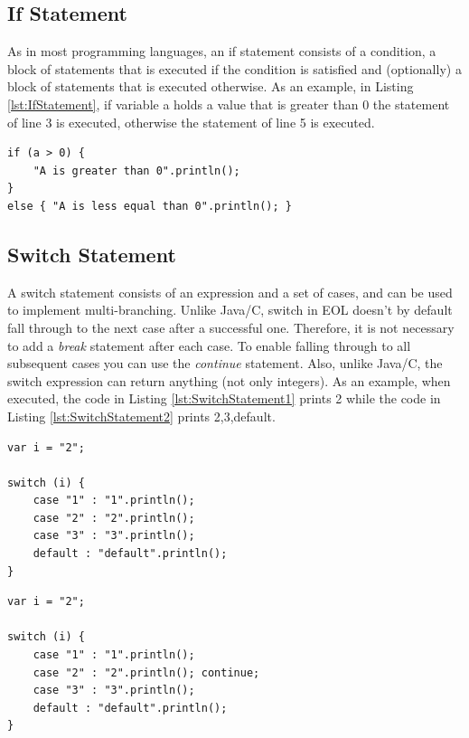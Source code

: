 \subsection{If Statement}

As in most programming languages, an if statement consists of a condition, a block of statements that is executed if the condition is satisfied and (optionally) a block of statements that is executed otherwise. As an example, in Listing \ref{lst:IfStatement}, if variable a holds a value that is greater than 0 the statement of line 3 is executed, otherwise the statement of line 5 is executed.

\begin{lstlisting}[float=h, caption=Example illustrating an if statement, label=lst:IfStatement, language=EOL]
if (a > 0) {
	"A is greater than 0".println();
}
else { "A is less equal than 0".println(); }
\end{lstlisting}

\subsection{Switch Statement}

A switch statement consists of an expression and a set of cases, and can be used to implement multi-branching. Unlike Java/C, switch in EOL doesn't by default fall through to the next case after a successful one. Therefore, it is not necessary to add a \emph{break} statement after each case. To enable falling through to all subsequent cases you can use the \emph{continue} statement. Also, unlike Java/C, the switch expression can return anything (not only integers). As an example, when executed, the code in Listing \ref{lst:SwitchStatement1} prints 2 while the code in Listing \ref{lst:SwitchStatement2} prints 2,3,default.

\begin{lstlisting}[float=h, caption=Example illustrating a switch statement, label=lst:SwitchStatement1, language=EOL]
var i = "2";

switch (i) {
	case "1" : "1".println(); 
	case "2" : "2".println();
	case "3" : "3".println();
	default : "default".println(); 
}
\end{lstlisting}

\begin{lstlisting}[float=h, caption=Example illustrating falling through cases in a switch statement, label=lst:SwitchStatement2, language=EOL]
var i = "2";

switch (i) {
	case "1" : "1".println(); 
	case "2" : "2".println(); continue;
	case "3" : "3".println();
	default : "default".println(); 
}
\end{lstlisting}

